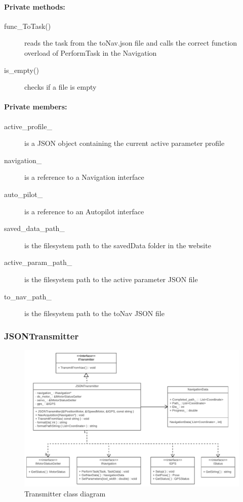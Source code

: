 \paragraph{Private methods:}
\begin{adjustwidth}{2.5em}{0pt}\begin{description}
		\item [func_ToTask()] reads the task from the toNav.json file and calls the correct function overload of PerformTask in the Navigation
		\item [is_empty()] checks if a file is empty
\end{description}\end{adjustwidth}

\paragraph{Private members:}
\begin{adjustwidth}{2.5em}{0pt}\begin{description}
		\item [active_profile_] is a JSON object containing the current active parameter profile
		\item [navigation_] is a reference to a Navigation interface
		\item [auto_pilot_] is a reference to an Autopilot interface
		\item [saved_data_path_] is the filesystem path to the savedData folder in the website
		\item [active_param_path_] is the filesystem path to the active parameter JSON file
		\item [to_nav_path_] is the filesystem path to the toNav JSON file
\end{description}\end{adjustwidth}

\subsubsection{JSONTransmitter}

\begin{figure}[H]
\centering
\includegraphics[width=1\linewidth]{Images/Design/Transmitter_class_diagram}
\caption{Transmitter class diagram}
\label{fig:Transmitter}
\end{figure}


